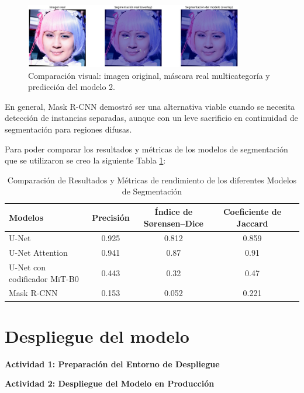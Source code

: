 \begin{enumerate}
\begin{itemize}
    \begin{figure}[H]
      \centering
      \includegraphics[width=0.85\textwidth]{4/figures/maskrcnn2.png}
      \caption{Comparación visual: imagen original, máscara real multicategoría y predicción del modelo 2.}
      \label{fig:validacionmaskrcnn2}
    \end{figure}
  
  
  \end{itemize}
  
  \vspace{0.2cm}
  En general, Mask R-CNN demostró ser una alternativa viable cuando se necesita detección de instancias separadas, aunque con un leve sacrificio en continuidad de segmentación para regiones difusas.
  


\end{enumerate}

Para poder comparar los resultados y métricas de los modelos de segmentación que se utilizaron se creo la siguiente Tabla \ref{tab:result_models}:
\begin{table}[H]
  \centering
  \caption{Comparación de Resultados y Métricas de rendimiento de los diferentes Modelos de Segmentación}
  \renewcommand{\arraystretch}{1.2} %
  \setlength{\tabcolsep}{5pt} %
  \begin{tabularx}{\textwidth}{@{}X c c c c@{}}
      \toprule
      \textbf{Modelos} & \textbf{Precisión} & \textbf{Índice de Sørensen–Dice} & \textbf{Coeficiente de Jaccard} \\ \midrule
      U-Net & 0.925 & 0.812 & 0.859  \\
      U-Net Attention & 0.941 & 0.87 & 0.91  \\
      U-Net con codificador MiT-B0 & 0.443 & 0.32 & 0.47  \\
      Mask R-CNN & 0.153 & 0.052 & 0.221  \\ 
      \bottomrule
  \end{tabularx}
  \label{tab:result_models}
\end{table}




\section{Despliegue del modelo}
\textbf{Actividad 1: Preparación del Entorno de Despliegue}

\textbf{Actividad 2: Despliegue del Modelo en Producción}

